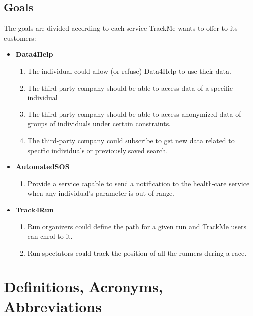 \documentclass[a4paper, hidelinks, 12pt]{report}
\newcommand\goal[1]{\item[{[G#1]}] }
\begin{document}
	\subsection{Goals}
	The goals are divided according to each service TrackMe wants to offer to its customers:
	\begin{itemize}
		\item{\textbf{Data4Help}}
		\begin{enumerate}
			\goal{1} The individual could allow (or refuse) Data4Help to use their data.
			\goal{2} The third-party company should be able to access data of a specific individual
			\goal{3} The third-party company should be able to access anonymized data of groups of individuals under certain constraints.
			\goal{4} The third-party company could subscribe to get new data related to specific individuals or previously saved search.
		\end{enumerate}
		
		\item{\textbf{AutomatedSOS}}
		\begin{enumerate}
			\goal{5} Provide a service capable to send a notification to the health-care service when any individual's parameter is out of range.
		\end{enumerate}
		
		\item{\textbf{Track4Run}}
		\begin{enumerate}
			\goal{6} Run organizers could define the path for a given run and TrackMe users can enrol to it.
			\goal{7} Run spectators could track the position of all the runners during a race.
		\end{enumerate}
	\end{itemize}
	
	\section{Definitions, Acronyms, Abbreviations}
\end{document}
